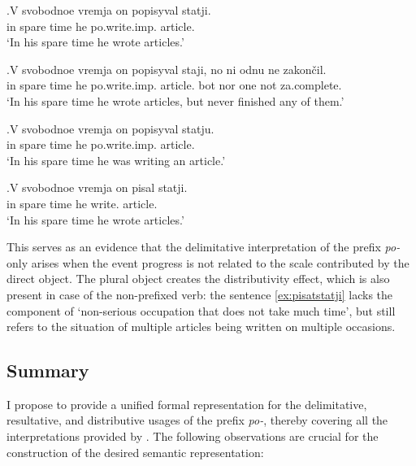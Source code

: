\exg.\label{ex:popisyvat}V svobodnoe vremja on popisyval statji.\\
in spare time he po.write.imp. article.\\
\trans `In his spare time he wrote articles.'

\exg.\label{ex:popisyvat:none}V svobodnoe vremja on popisyval staji, no ni odnu ne zakon\v{c}il.\\
in spare time he po.write.imp. article. bot nor one not za.complete.\\
\trans `In his spare time he wrote articles, but never finished any of them.'

\exg.\label{ex:popisyvat:single}V svobodnoe vremja on popisyval statju.\\
in spare time he po.write.imp. article.\\
\trans `In his spare time he was writing an article.'

\exg.\label{ex:pisatstatji}V svobodnoe vremja on pisal statji.\\
in spare time he write. article.\\
\trans `In his spare time he wrote articles.'

This serves as an evidence that the delimitative interpretation of the prefix \textit{po-} only arises when the event progress is not related to the scale contributed by the direct object. The plural object creates the distributivity effect, which is also present in case of the non-prefixed verb: the sentence \ref{ex:pisatstatji} lacks the component of `non-serious occupation that does not take much time', but still refers to the situation of multiple articles being written on multiple occasions. 

\subsection{Summary}
I propose to provide a unified formal representation for the delimitative, resultative, and distributive usages of the prefix \textit{po-}, thereby covering all the interpretations provided by \citet{Shvedova:82}. The following observations are crucial for the construction of the desired semantic representation:

